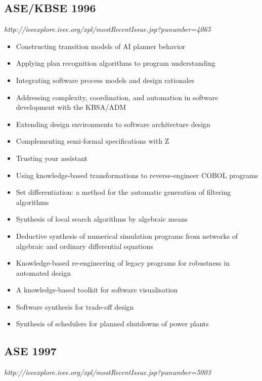 \subsection{ASE/KBSE 1996}

{\small \em http://ieeexplore.ieee.org/xpl/mostRecentIssue.jsp?punumber=4065}

{\small
\begin{itemize}[itemsep=-1ex]
  \item Constructing transition models of AI planner behavior
  \item Applying plan recognition algorithms to program understanding
  \item Integrating software process models and design rationales
  \item Addressing complexity, coordination, and automation in software development with the KBSA/ADM
  \item Extending design environments to software architecture design
  \item Complementing semi-formal specifications with Z
  \item Trusting your assistant
  \item Using knowledge-based transformations to reverse-engineer COBOL programs
  \item Set differentiation: a method for the automatic generation of filtering algorithms
  \item Synthesis of local search algorithms by algebraic means
  \item Deductive synthesis of numerical simulation programs from networks of algebraic and ordinary differential equations
  \item Knowledge-based re-engineering of legacy programs for robustness in automated design
  \item A knowledge-based toolkit for software visualisation
  \item Software synthesis for trade-off design
  \item Synthesis of schedulers for planned shutdowns of power plants 
\end{itemize}
}

\subsection{ASE 1997}

{\small \em http://ieeexplore.ieee.org/xpl/mostRecentIssue.jsp?punumber=5003}

